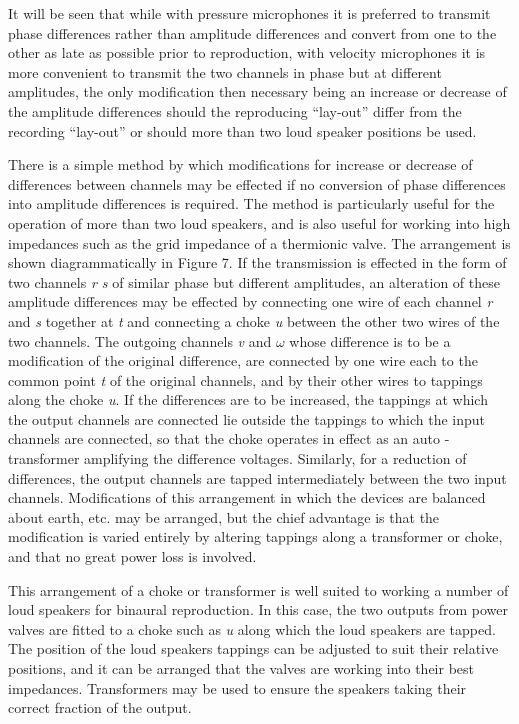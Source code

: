 \documentclass[11pt]{article}
\begin{document}
\begin{multicols*}{2}
It will be seen that while with pressure microphones it is preferred to transmit phase differences rather than amplitude differences and convert from one to the other as late as possible prior to reproduction, with velocity microphones it is more convenient to transmit the two channels in phase but at different amplitudes, the only modification then necessary being an increase or decrease of the amplitude differences should the reproducing “lay-out” differ from the recording “lay-out” or should more than two loud speaker positions be used.

There is a simple method by which modifications for increase or decrease of differences between channels may be effected if no conversion of phase differences into amplitude differences is required. The method is particularly useful for the operation of more than two loud speakers, and is also useful for working into high impedances such as the grid impedance of a thermionic valve. The arrangement is shown diagrammatically in Figure 7. If the transmission is effected in the form of two channels \textit{r s} of similar phase but different amplitudes, an alteration of these amplitude differences may be effected by connecting one wire of each channel \textit{r} and \textit{s} together at \textit{t} and connecting a choke \textit{u} between the other two wires of the two channels. The outgoing channels \textit{v} and $\omega$ whose difference is to be a modification of the original difference, are connected by one wire each to the common point \textit{t} of the original channels, and by their other wires to tappings along the choke \textit{u}. If the differences are to be increased, the tappings at which the output channels are connected lie outside the tappings to which the input channels are connected, so that the choke operates in effect as an auto - transformer amplifying the difference voltages. Similarly, for a reduction of differences, the output channels are tapped intermediately between the two input channels. Modifications of this arrangement in which the devices are balanced about earth, etc. may be arranged, but the chief advantage is that the modification is varied entirely by altering tappings along a transformer or choke, and that no great power loss is involved.

This arrangement of a choke or transformer is well suited to working a number of loud speakers for binaural reproduction. In this case, the two outputs from power valves are fitted to a choke such as \textit{u} along which the loud speakers are tapped. The position of the loud speakers tappings can be adjusted to suit their relative positions, and it can be arranged that the valves are working into their best impedances. Transformers may be used to ensure the speakers taking their correct fraction of the output.


\end{multicols*}
\end{document}
